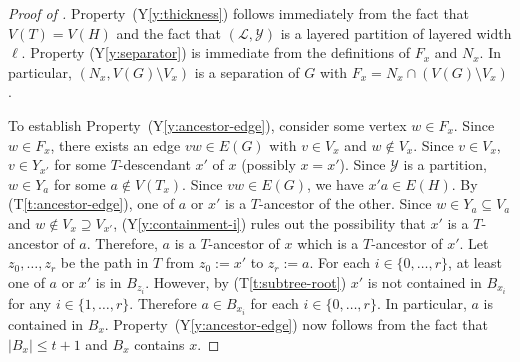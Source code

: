 \documentclass{patmorin}
\newcommand{\tref}[1]{(T\ref{t:#1})}
\newcommand{\yref}[1]{(Y\ref{y:#1})}
\renewcommand{\le}{\leqslant}
\begin{document}
\begin{proof}[Proof of ]
  Property~\yref{thickness} follows immediately from the fact that $V(T)=V(H)$ and the fact that $(\mathcal{L},\mathcal{Y})$ is a layered partition of layered width $\ell$.  Property \yref{separator} is immediate from the definitions of $F_x$ and $N_x$.  In particular, $(N_x,V(G)\setminus V_x)$ is a separation of $G$ with $F_x=N_x\cap(V(G)\setminus V_x)$. 

  To establish Property~\yref{ancestor-edge}, consider some vertex $w\in F_x$.  Since $w\in F_x$, there exists an edge $vw\in E(G)$ with $v\in V_x$ and $w\not\in V_x$.  Since $v\in V_x$, $v\in Y_{x'}$ for some $T$-descendant $x'$ of $x$ (possibly $x=x'$). Since $\mathcal{Y}$ is a partition, $w\in Y_{a}$ for some $a\not\in V(T_x)$.  Since $vw\in E(G)$, we have $x'a\in E(H)$.  By \tref{ancestor-edge}, one of $a$ or $x'$ is a $T$-ancestor of the other. Since $w\in Y_a\subseteq V_a$ and $w\not\in V_x\supseteq V_{x'}$, \yref{containment-i} rules out the possibility that $x'$ is a $T$-ancestor of $a$. Therefore, $a$ is a $T$-ancestor of $x$ which is a $T$-ancestor of $x'$.  Let $z_0,\ldots,z_r$ be the path in $T$ from $z_0:=x'$ to $z_r:=a$.  For each $i\in\{0,\ldots,r\}$, at least one of $a$ or $x'$ is in $B_{z_i}$.  However, by \tref{subtree-root} $x'$ is not contained in $B_{x_i}$ for any $i\in\{1,\ldots,r\}$.  Therefore $a\in B_{x_i}$ for each $i\in\{0,\ldots,r\}$.  In particular, $a$ is contained in $B_x$.
  Property~\yref{ancestor-edge} now follows from the fact that $|B_x|\le t+1$ and $B_x$ contains $x$.
\end{proof}


\end{document}
